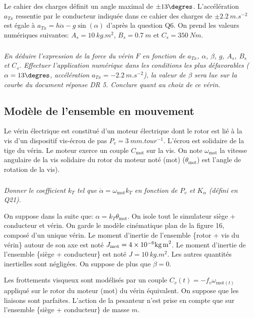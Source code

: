 \documentclass[10pt,fleqn]{article} %
\begin{document}
Le cahier des charges définit un angle maximal de $\pm 13\degres$. 
L'accélération $a_{Tx}$ ressentie par le conducteur indiquée dans ce cahier des charges de $\pm \SI{2,2}{m.s^{-2}}$ est égale à $a_{Tx} = h\ddot{\alpha} - g\sin(\alpha)$ d'après la question Q6. 
On prend les valeurs numériques suivantes: $A_s = \SI{10}{kg.m^2}$, $B_s = \SI{0,7}{m}$ et $C_s = \SI{350}{Nm}$. 

\subparagraph{}
\textit{En déduire l'expression de la force du vérin $F$ en fonction de $a_{Tx}$, $\alpha$, $\beta$, $g$, $A_s$, $B_s$ et $C_s$. Effectuer l'application numérique dans les conditions les plus défavorables ($\alpha = 13\degres$, accélération $a_{Tx}= - \SI{2,2}{m.s^{-2}}$), la valeur de $\beta$ sera lue sur la courbe du document réponse DR 5. Conclure quant au choix de ce vérin.}



\subsection{Modèle de l'ensemble en mouvement}

Le vérin électrique est constitué d'un moteur électrique dont le rotor est lié à la vis d'un dispositif vis-écrou de pas $P_v = \SI{3}{mm.tour^{-1}}$. L'écrou est solidaire de la tige du vérin. Le moteur exerce un couple $C_{\text{mot}}$ sur la vis. On note $\omega_{\text{mot}}$ la vitesse angulaire de la vis solidaire du rotor du moteur noté (mot) ($\theta_{\text{mot}}$) est l'angle de rotation de la vis). 

\subparagraph{}
\textit{Donner le coefficient $k_T$ tel que $\dot{\alpha}=\omega_{\text{mot}} k_T$ en fonction de $P_v$ et $K_{\alpha}$ (défini en Q21). }

On suppose dans la suite que: $\alpha = k_T\theta_{\text{mot}}$. 
On isole tout le simulateur {siège + conducteur et vérin}. On garde le modèle cinématique plan de la figure 16, %
composé d'un unique vérin. 
Le moment d'inertie de l'ensemble \{rotor + vis du vérin\} autour de son axe est noté $J_{\text{mot}}= 4 \times 10^{-6}\text{kg\,m}^2$. Le moment d'inertie de l'ensemble \{siège + conducteur\} est noté $J = \SI{10}{kg.m^2}$. Les autres quantités inertielles sont négligées. 
On suppose de plus que $\dot{\beta} = 0$.
 
Les frottements visqueux sont modélisés par un couple $C_v(t) = -f_v \omega_{\text{mot}(t)}$ appliqué sur le rotor du moteur (mot) du vérin équivalent. On suppose que les liaisons sont parfaites. L'action de la pesanteur n'est prise en compte que sur l'ensemble \{siège + conducteur\} de masse $m$. 
\end{document}
